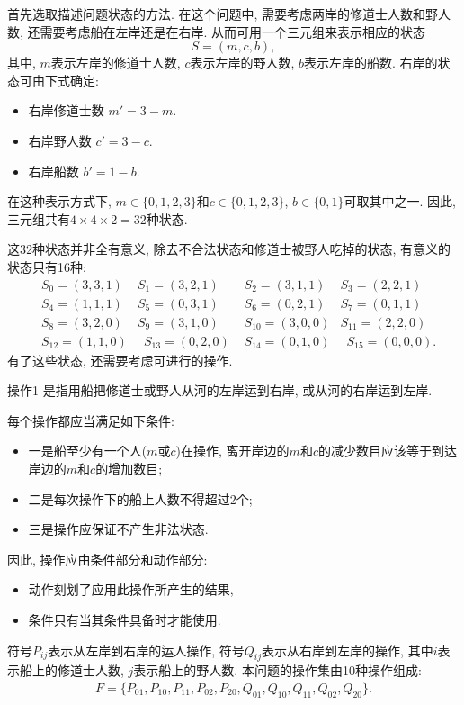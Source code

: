 \begin{result}
首先选取描述问题状态的方法. 在这个问题中, 需要考虑两岸的修道士人数和野人数, 还需要考虑船在左岸还是在右岸. 从而可用一个三元组来表示相应的状态
         $$S=(m, c, b),$$
其中, $m$表示左岸的修道士人数, $c$表示左岸的野人数, $b$表示左岸的船数.
右岸的状态可由下式确定:
\begin{itemize}
\item 右岸修道士数  $m'=3-m$.
\item 右岸野人数   $ c'=3-c$.
\item 右岸船数      $b'=1-b$.
\end{itemize}
在这种表示方式下, $m\in \{0,1,2,3\}$和$c\in \{0,1,2,3\}$, $b\in \{0,1\}$可取其中之一. 因此, 三元组共有$4\times 4\times 2=32$种状态.

这32种状态并非全有意义, 除去不合法状态和修道士被野人吃掉的状态, 有意义的状态只有16种:
\begin{align*}
        &S_0=(3, 3, 1)  &S_1=(3, 2, 1)     &\,\,S_2=(3, 1, 1)&S_3=(2, 2, 1)\\
        &S_4=(1, 1, 1)  &S_5=(0, 3, 1)     &\,\,S_6=(0, 2, 1)&S_7=(0, 1, 1)\\
        &S_8=(3, 2, 0)  &S_9=(3, 1, 0)     &\,\,S_{10}=(3, 0, 0)&S_{11}=(2, 2, 0)\\
        &S_{12}=(1, 1,0)&\,\,\,S_{13}=(0, 2, 0)  &\,\,S_{14}=(0, 1, 0)&\,\,\,S_{15}=(0, 0, 0).
\end{align*}
有了这些状态, 还需要考虑可进行的操作.

\begin{mydef}{操作}{1}
    是指用船把修道士或野人从河的左岸运到右岸, 或从河的右岸运到左岸.
\end{mydef}

每个操作都应当满足如下条件:
\begin{itemize}
\item 一是船至少有一个人($m$或$c$)在操作, 离开岸边的$m$和$c$的减少数目应该等于到达岸边的$m$和$c$的增加数目;
\item 二是每次操作下的船上人数不得超过2个;
\item 三是操作应保证不产生非法状态.
\end{itemize}
因此, 操作应由条件部分和动作部分:
\begin{itemize}
\item 动作刻划了应用此操作所产生的结果,
\item 条件只有当其条件具备时才能使用.
\end{itemize}
\begin{remark}
    符号$P_{ij}$表示从左岸到右岸的运人操作, 符号$Q_{ij}$表示从右岸到左岸的操作, 其中$i$表示船上的修道士人数, $j$表示船上的野人数.
本问题的操作集由10种操作组成:
\begin{align}
  F=\{P_{01}, P_{10}, P_{11}, P_{02}, P_{20},Q_{01}, Q_{10}, Q_{11}, Q_{02}, Q_{20}\}.
\end{align}
\end{remark}


\end{result}
